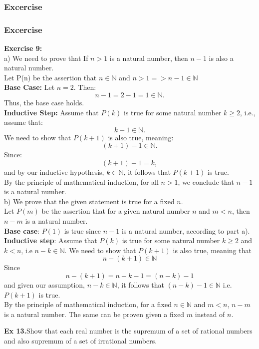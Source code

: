 \subsubsection{Excercise}


\subsubsection{Excercise}
\noindent 
\textbf{Exercise 9:}\\
a) We need to prove that If $n > 1$ is a natural number, then $n - 1$ is also a natural number.\\
Let P(n) be the assertion that $n \in \mathbb{N}$ and $n > 1 => n - 1 \in \mathbb{N}$\\
\textbf{Base Case:} Let $n = 2$. Then:
\[
n - 1 = 2 - 1 = 1 \in \mathbb{N}.
\]
Thus, the base case holds.\\
\textbf{Inductive Step:} Assume that $P(k)$ is true for some natural number $k \geq 2$, i.e., assume that:
\[
k - 1 \in \mathbb{N}.
\]
We need to show that $P(k+1)$ is also true, meaning:
\[
(k+1) - 1 \in \mathbb{N}.
\]
Since:
\[
(k+1) - 1 = k,
\]
and by our inductive hypothesis, $k \in \mathbb{N}$, it follows that $P(k+1)$ is true.\\
By the principle of mathematical induction, for all $n > 1$, we conclude that $n - 1$ is a natural number.\\
b) We prove that the given statement is true for a fixed $n$.\\
Let $P(m)$ be the assertion that for a given natural number $n$ and $m < n$, then $n - m$ is a natural number.\\
\textbf{Base case}: $P(1)$ is true since $n - 1$ is a natural number, according to part a).\\
\textbf{Inductive step}: Assume that $P(k)$ is true for some natural number $k \geq 2$ and $k < n$, i.e $n - k \in \mathbb{N}$. We need to show that $P(k + 1)$ is also true, meaning that
$$
n - (k + 1) \in \mathbb{N}
$$
Since 
$$
n - (k + 1) = n - k - 1 = (n - k) - 1
$$
and given our assumption, $n - k \in \mathbb{N}$, it follows that $(n - k) - 1 \in \mathbb{N}$ i.e. $P(k + 1)$ is true.\\
By the principle of mathematical induction, for a fixed $n \in \mathbb{N}$ and $m < n$, $n - m$ is a natural number. The same can be proven given a fixed $m$ instead of $n$.

\textbf{Ex 13.}Show that each real number is the supremum of a set of rational numbers and also supremum of a set of irrational numbers.

